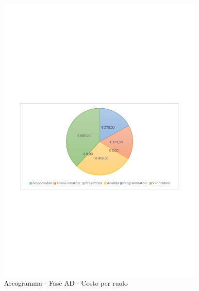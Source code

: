 \documentclass[../PianoProgetto.tex]{subfiles}
\begin{document}
	\begin{figure}[!h]
		\centering
		\includegraphics[width=0.93\textwidth , trim=2cm 9.5cm 2cm 11cm]{grafici/AD/AD-costo}
			\caption{Areogramma - Fase AD - Costo per ruolo}
		\label{fig:CircleChart-faseAD_costo}
	\end{figure}
\vfill	
\end{document}
